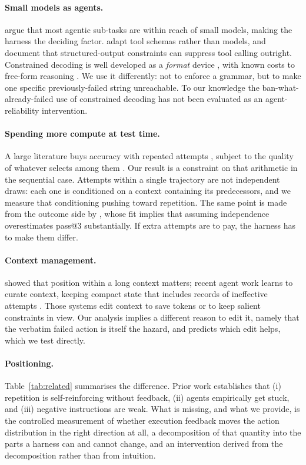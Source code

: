 \paragraph{Small models as agents.}
\citet{belcak2025slmagents} argue that most agentic sub-tasks are within reach of
small models, making the harness the deciding factor.
\citet{toolschemas2025} adapt tool schemas rather than models, and
\citet{constrainttax2026} document that structured-output constraints can
suppress tool calling outright. Constrained decoding is well developed as a
\emph{format} device \citep{willard2023outlines}, with known costs to free-form
reasoning \citep{tam2024speakfreely}. We use it differently: not to enforce a
grammar, but to make one specific previously-failed string unreachable. To our
knowledge the ban-what-already-failed use of constrained decoding has not been
evaluated as an agent-reliability intervention.

\paragraph{Spending more compute at test time.}
A large literature buys accuracy with repeated attempts
\citep{brown2024monkeys,snell2024testtime}, subject to the quality of whatever
selects among them \citep{stroebl2024inferenceflaws}. Our result is a constraint
on that arithmetic in the sequential case. Attempts within a single trajectory
are not independent draws: each one is conditioned on a context containing its
predecessors, and we measure that conditioning pushing toward repetition. The
same point is made from the outcome side by \citet{yang2026contamination}, whose
fit implies that assuming independence overestimates pass@3 substantially. If
extra attempts are to pay, the harness has to make them differ.

\paragraph{Context management.}
\citet{liu2024lostmiddle} showed that position within a long context matters;
recent agent work learns to curate context, keeping compact state that includes
records of ineffective attempts \citep{adacom2026context}. Those systems edit
context to save tokens or to keep salient constraints in view. Our analysis
implies a different reason to edit it, namely that the verbatim failed action
is itself the hazard, and predicts which edit helps, which we test directly.

\paragraph{Positioning.}
Table~\ref{tab:related} summarises the difference. Prior work establishes that
(i) repetition is self-reinforcing without feedback, (ii) agents empirically get
stuck, and (iii) negative instructions are weak. What is missing, and what we
provide, is the controlled measurement of whether execution feedback moves the
action distribution in the right direction at all, a decomposition of that
quantity into the parts a harness can and cannot change, and an intervention
derived from the decomposition rather than from intuition.


